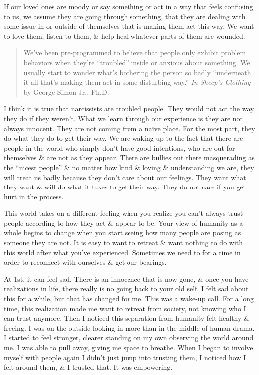 \documentclass{article}
\numberwithin{equation}{section}
\begin{document}
If our loved ones are moody or say something or act in a way that feels confusing to us, we assume they are going through something, that they are dealing with some issue in or outside of themselves that is making them act this way. We want to love them, listen to them, \& help heal whatever parts of them are wounded.
\begin{quotation}
	We've been pre-programmed to believe that people only exhibit problem behaviors when they're ``troubled'' inside or anxious about something. We usually start to wonder what's bothering the person so badly ``underneath it all that's making them act in some disturbing way.'' \textit{In Sheep's Clothing} by George Simon Jr., Ph.D.
\end{quotation}
I think it is true that narcissists are troubled people. They would not act the way they do if they weren't. What we learn through our experience is they are not always innocent. They are not coming from a na\"ive place. For the most part, they do what they do to get their way. We are waking up to the fact that there are people in the world who simply don't have good intentions, who are out for themselves \& are not as they appear. There are bullies out there masquerading as the ``nicest people'' \& no matter how kind \& loving \& understanding we are, they will treat us badly because they don't care about our feelings. They want what they want \& will do what it takes to get their way. They do not care if you get hurt in the process.

This world takes on a different feeling when you realize you can't always trust people according to how they act \& appear to be. Your view of humanity as a whole begins to change when you start seeing how many people are posing as someone they are not. It is easy to want to retreat \& want nothing to do with this world after what you've experienced. Sometimes we need to for a time in order to reconnect with ourselves \& get our bearings.

At 1st, it can feel sad. There is an innocence that is now gone, \& once you have realizations in life, there really is no going back to your old self. I felt sad about this for a while, but that has changed for me. This was a wake-up call. For a long time, this realization made me want to retreat from society, not knowing who I can trust anymore. Then I noticed this separation from humanity felt healthy \& freeing. I was on the outside looking in more than in the middle of human drama. I started to feel stronger, clearer standing on my own observing the world around me. I was able to pull away, giving me space to breathe. When I began to involve myself with people again I didn't just jump into trusting them, I noticed how I felt around them, \& I trusted that. It was empowering.
\end{document}

